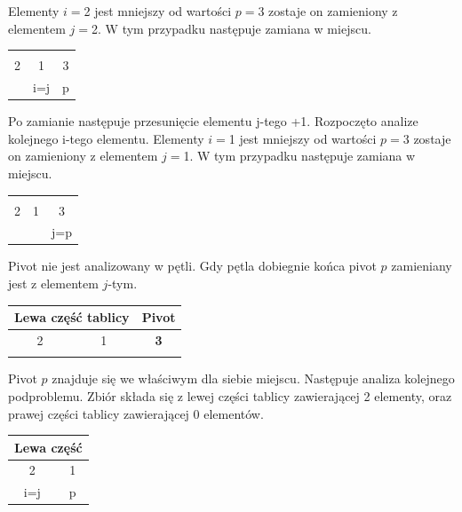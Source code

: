 \documentclass[a4paper,11pt]{report}
\begin{document}
Elementy $i=$2 jest mniejszy od wartości $p=$3 zostaje on zamieniony z elementem $j=$2. W tym przypadku następuje zamiana w miejscu.


\begin{table}[h!]
\Large
\centering
\begin{tabular}{|c|c|c|}
\hline
 & \cellcolor{black!25} &   \\
2 & \cellcolor{black!25}1 & 3 \\ \hdashline
 & i=j  & p \\ \hline
\end{tabular}

\end{table}

Po zamianie następuje przesunięcie elementu j-tego +1. Rozpoczęto analize kolejnego i-tego elementu. Elementy $i=$1 jest mniejszy od wartości $p=$3 zostaje on zamieniony z elementem $j=$1. W tym przypadku następuje zamiana w miejscu.


\begin{table}[h!]
\Large
\centering
\begin{tabular}{|c|c|c|}
\hline
 &  & \cellcolor{black!25}  \\
2 & 1 & \cellcolor{black!25}3 \\ \hdashline
 &   & j=p \\ \hline
\end{tabular}

\end{table}

Pivot nie jest analizowany w pętli. Gdy pętla dobiegnie końca pivot $p$ zamieniany jest z elementem $j$-tym.

\begin{table}[h!]
\Large
\centering
\begin{tabular}{|c|c|c|}
\hline
\multicolumn{2}{|c|}{Lewa część tablicy} & Pivot \\ \hline
2 & 1 & \textbf{3}\\ \hdashline
 &  &  \\ \hline
\end{tabular}
\end{table}

Pivot $p$ znajduje się we właściwym dla siebie miejscu. 
Następuje analiza kolejnego podproblemu. Zbiór składa się z lewej części tablicy zawierającej 2 elementy, oraz prawej części tablicy zawierającej 0 elementów.

\begin{table}[h!]
\Large
\centering
\begin{tabular}{|c|c|}
\hline
\multicolumn{2}{|c|}{Lewa część} \\ \hline
\cellcolor{black!25}2 & 1 \\ \hdashline
i=j & p \\ \hline
\end{tabular}

\end{table}
\end{document}
